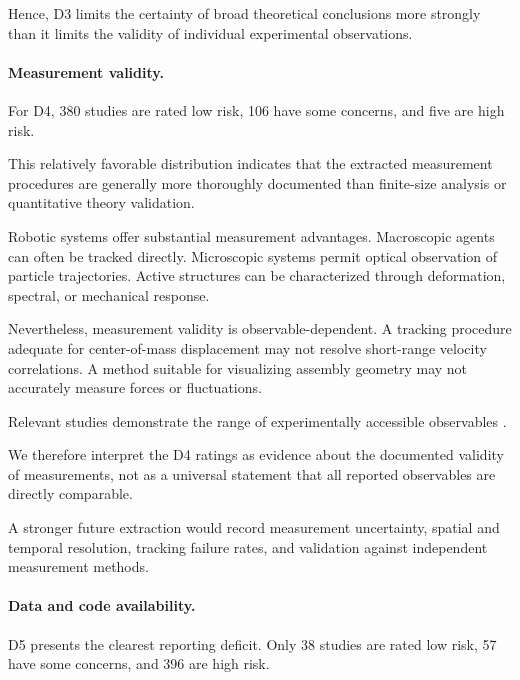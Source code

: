 Hence, D3 limits the certainty
of broad theoretical conclusions
more strongly than it limits
the validity of individual
experimental observations.

\paragraph*{Measurement validity.}

For D4, 380 studies are rated low risk,
106 have some concerns, and five
are high risk.

This relatively favorable distribution
indicates that the extracted
measurement procedures are generally
more thoroughly documented than
finite-size analysis or
quantitative theory validation.

Robotic systems offer substantial
measurement advantages.
Macroscopic agents can often
be tracked directly.
Microscopic systems permit
optical observation of
particle trajectories.
Active structures can be
characterized through deformation,
spectral, or mechanical response.

Nevertheless, measurement validity
is observable-dependent.
A tracking procedure adequate
for center-of-mass displacement
may not resolve short-range
velocity correlations.
A method suitable for
visualizing assembly geometry
may not accurately measure
forces or fluctuations.

Relevant studies demonstrate
the range of experimentally
accessible observables
\cite{Tarcai2011patternstransition,Buerle2020formationofstable,Chvykov2020lowrattlingapred,Brandenbourger2021limitcyclesturnac,Barone2024experimentalandnum,Hanson2025electrokineticpropu,Engbring2023anonlinearfluctuat}.

We therefore interpret the D4 ratings
as evidence about the documented
validity of measurements, not as
a universal statement that
all reported observables
are directly comparable.

A stronger future extraction
would record measurement uncertainty,
spatial and temporal resolution,
tracking failure rates, and
validation against independent
measurement methods.

\paragraph*{Data and code availability.}

D5 presents the clearest reporting deficit.
Only 38 studies are rated low risk,
57 have some concerns, and 396
are high risk.

